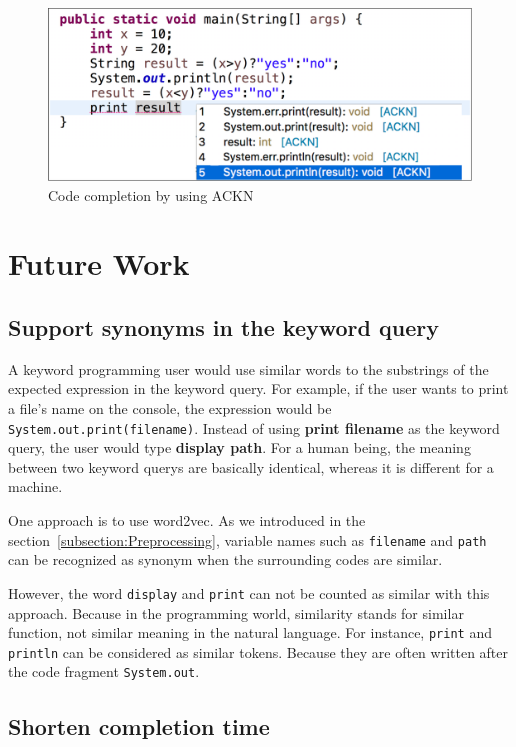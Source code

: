 \documentclass[PRO,english]{ipsj}
\begin{document}
\begin{figure}[!ht]
\centering
\includegraphics[scale=0.23]{Figure/ACKN.pdf}
\caption{Code completion by using ACKN}
\label{fig:ACKN}
\end{figure}

\section{Future Work}

\subsection{Support synonyms in the keyword query}
A keyword programming user would use similar words to the substrings of the expected expression in the keyword query. For example, if the user wants to print a file's name on the console, the expression would be \texttt{System.out.print(filename)}. Instead of using \textbf{print filename} as the keyword query, the user would type \textbf{display path}. For a human being, the meaning between two keyword querys are basically identical, whereas it is different for a machine. 

One approach is to use word2vec. As we introduced in the section~\ref{subsection:Preprocessing}, variable names such as \texttt{filename} and \texttt{path} can be recognized as synonym when the surrounding codes are similar. 

However, the word \texttt{display} and \texttt{print} can not be counted as similar with this approach. Because in the programming world, similarity stands for similar function, not similar meaning in the natural language. For instance, \texttt{print} and \texttt{println} can be considered as similar tokens. Because they are often written after the code fragment \texttt{System.out}.

\subsection{Shorten completion time}
\end{document}
